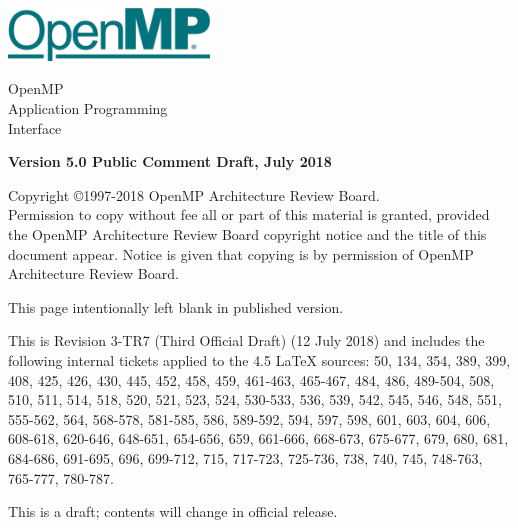 
  \begin{titlepage}
    \begin{flushleft}
     \hspace{-6em} \includegraphics[width=0.4\textwidth]{openmp-logo.png}
    \end{flushleft}

    \begin{adjustwidth}{-0.75in}{0in}
    \begin{center}
      \Huge
      \textsf{OpenMP\\Application Programming\\Interface}

      \vspace{0.5in}\textsf{    }\vspace{-0.7in}
      \normalsize

      \vspace{1.0in}

      \textbf{Version 5.0 Public Comment Draft, July 2018}
    \end{center}
    \end{adjustwidth}

    \vspace{3.0in}

\begin{adjustwidth}{0pt}{1em}\setlength{\parskip}{0.25\baselineskip}%
Copyright \copyright 1997-2018 OpenMP Architecture Review Board.\\
Permission to copy without fee all or part of this material is granted,
provided the OpenMP Architecture Review Board copyright notice and
the title of this document appear. Notice is given that copying is by
permission of OpenMP Architecture Review Board.\end{adjustwidth}

  \end{titlepage}


\clearpage
\thispagestyle{empty}
\phantom{a}
This page intentionally left blank in published version.

This is Revision 3-TR7 (Third Official Draft) (12 July 2018) and
includes the following internal tickets applied to the 4.5 LaTeX sources:
50, 134, 354, 389, 399, 408, 425, 426, 430, 445, 452, 458, 459, 461-463, 
465-467, 484, 486, 489-504, 508, 510, 511, 514, 518, 520, 521, 523, 
524, 530-533, 536, 539, 542, 545, 546, 548, 551, 555-562, 564, 568-578, 
581-585, 586, 589-592, 594, 597, 598, 601, 603, 604, 606, 608-618, 620-646, 
648-651, 654-656, 659, 661-666, 668-673, 675-677, 679, 680, 681, 684-686, 
691-695, 696, 699-712, 715, 717-723, 725-736, 738, 740, 745, 748-763, 
765-777, 780-787.

This is a draft; contents will change in official release.

\vfill

